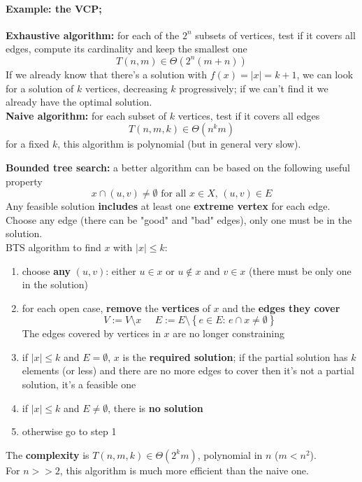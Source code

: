 \documentclass[11pt]{article}
\begin{document}
	\paragraph{Example: the VCP;} \textbf{Exhaustive algorithm:} for each of the $2^n$ subsets of vertices, test if it covers all edges, compute its cardinality and keep the smallest one
	$$ T(n,m) \in \Theta \left(2^n (m+n)\right) $$
	If we already know that there's a solution with $f(x) = |x| = k+1$, we can look for a solution of $k$ vertices, decreasing $k$ progressively; if we can't find it we already have the optimal solution.\\
	
	\textbf{Naive algorithm:} for each subset of $k$ vertices, test if it covers all edges
	$$ T(n,m,k) \in \Theta \left(n^k m\right) $$
	for a fixed $k$, this algorithm is polynomial (but in general very slow).\\
	
	\newpage
	
	\textbf{Bounded tree search:} a better algorithm can be based on the following useful property
	$$ x \cap (u,v) \neq \emptyset \text{ for all } x \in X, \, (u,v) \in E $$
	Any feasible solution \textbf{includes} at least one \textbf{extreme vertex} for each edge.\\
	Choose any edge (there can be "good" and "bad" edges), only one must be in the solution.\\
	
	BTS algorithm to find $x$ with $|x| \leq k$:
	\begin{enumerate}
		\item choose \textbf{any} $(u,v)$: either $u \in x$ or $u \notin x$ and $v \in x$ (there must be only one in the solution)
		\item for each open case, \textbf{remove} the \textbf{vertices} of $x$ and the \textbf{edges they cover}
		$$ V := V \setminus x \;\;\;\;\; E := E \setminus \left\{e \in E: \, e \cap x \neq \emptyset \right\}$$
		The edges covered by vertices in $x$ are no longer constraining
		\item if $|x| \leq k$ and $E = \emptyset$, $x$ is the \textbf{required solution}; if the partial solution has $k$ elements (or less) and there are no more edges to cover then it's not a partial solution, it's a feasible one
		\item if $|x| \leq k$ and $E \neq \emptyset$, there is \textbf{no solution}
		\item otherwise go to step 1
	\end{enumerate}
	The \textbf{complexity} is $T(n,m,k) \in \Theta(2^k m)$, polynomial in $n$ ($m < n^2$). \\
	For $n>>2$, this algorithm is much more efficient than the naive one.\\
	
\end{document}
